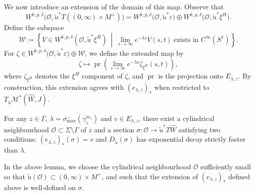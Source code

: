 \documentclass[11pt, a4paper]{amsart}
\newcommand{\cO}{\mathcal{O}}
\begin{document}
We now introduce an extension of the domain of this map. Observe that
\[
W^{k,p,\delta}\big(\mathcal{O}, \tilde{u}^*T((0,\infty)\times M^+)\big)
= W^{k,p,\delta}\big(\mathcal{O}, \tilde{u}^*\varepsilon\big) \oplus W^{k,p,\delta}\big(\mathcal{O}, \tilde{u}^*\xi^H\big).
\]
Define the subspace
\[
\mathcal{W} \coloneqq \left\{ V \in W^{k,p,\delta}(\mathcal{O}, \tilde{u}^*\xi^H) \ \middle|\ \lim_{s\to\infty} e^{-\lambda s} V(s,t)\ \text{exists in } C^\infty(S^1) \right\}.
\]
For $\zeta \in W^{k,p,\delta}\big(\mathcal{O}, \tilde{u}^*\varepsilon\big) \oplus \mathcal{W}$, we define the extended map by
\[
\zeta \longmapsto \operatorname{pr}\!\left( \lim_{s\to\infty} e^{-\lambda s} \zeta_{\xi^H}(s,t) \right),
\]
where $\zeta_{\xi^H}$ denotes the $\xi^H$ component of $\zeta$, and $\operatorname{pr}$ is the projection onto $E_{\lambda,z}$. By construction, this extension agrees with $(e_{\lambda,z})_*$ when restricted to $T_{\tilde{u}}\mathcal{M}^*(\widehat{W},J)$.

\begin{lemma}\label{local_existence}
For any $z\in\Gamma$, $\lambda = \sigma^-_{\max}(\gamma_z^{m_z})$ and $v\in E_{\lambda,z}$, there exist a cylindrical neighbourhood $\cO \subset \Sigma\setminus \Gamma$ of $z$ and a section $\sigma: \cO \rightarrow \tilde{u}^*T\widehat{W}$ satisfying two conditions: $(e_{\lambda,z})_*(\sigma)=v$ and $D_{\tilde{u}}(\sigma)$ has exponential decay strictly faster than $\lambda$.
\end{lemma}

In the above lemma, we choose the cylindrical neighbourhood $\cO$ sufficiently small so that $\tilde{u}(\cO) \subset (0,\infty)\times M^+$, and such that the extension of $(e_{\lambda,z})_*$ defined above is well-defined on $\sigma$.
\end{document}
